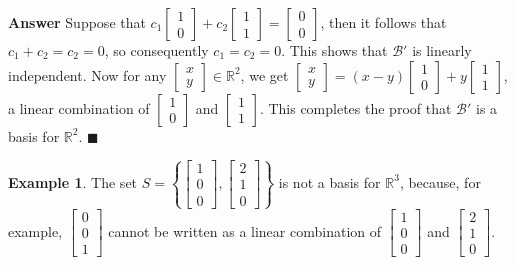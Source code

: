 \documentclass[12pt,letterpaper]{book}
\numberwithin{equation}{section}
\theoremstyle{definition}
\newtheorem{example}[thm]{\textbf{Example}}
\newenvironment{answer}{\noindent\textbf{Answer}}{\hfill$\blacksquare$\vspace{0.1in}}
\begin{document}
\begin{answer}
Suppose that $c_1\left[\begin{array}{r} 1 \\
0 \end{array}\right]+c_2\left[\begin{array}{r} 1 \\
1 \end{array}\right]=\left[\begin{array}{r} 0 \\
0 \end{array}\right]$, then it follows that $c_1+c_2=c_2=0$, so consequently $c_1=c_2=0$. This shows that $\mathscr{B}'$ is linearly independent. Now for any $\left[\begin{array}{r} x \\
y \end{array}\right]\in \mathbb{R}^2$, we get $\left[\begin{array}{r} x \\
y \end{array}\right]=(x-y)\left[\begin{array}{r} 1 \\
0 \end{array}\right]+y\left[\begin{array}{r} 1 \\
1 \end{array}\right]$, a linear combination of $\left[\begin{array}{r} 1 \\
0 \end{array}\right]$ and $\left[\begin{array}{r} 1 \\
1 \end{array}\right]$. This completes the proof that $\mathscr{B}'$ is a basis for $\mathbb{R}^2$.
\end{answer}

\begin{example} The set $S=\left\{\left[\begin{array}{r} 1 \\
0 \\ 0 \end{array}\right],\left[\begin{array}{r} 2 \\ 1 \\ 0
\end{array}\right]\right\}$ is not a basis for
$\mathbb{R}^3$, because, for example, $\left[\begin{array}{r} 0 \\ 0 \\ 1
\end{array}\right]$ cannot be written as a linear combination of $\left[\begin{array}{r} 1 \\
0 \\ 0 \end{array}\right]$ and $\left[\begin{array}{r} 2 \\ 1 \\ 0
\end{array}\right]$.
\end{example}
\end{document}
